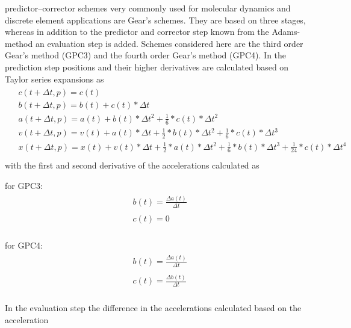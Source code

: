 \par
predictor–corrector schemes very commonly used for molecular dynamics and discrete element
applications are Gear’s schemes. They are based on three stages, whereas in addition to the
predictor and corrector step known from the Adams-method an evaluation step is added. Schemes
considered here are the third order Gear’s method (GPC3) and the fourth order Gear’s method (GPC4).
In the prediction step positions and their higher derivatives are calculated based on Taylor series
expansions as
\begin{align}\label{eqn:gearP}
    \begin{split}
        &c(t+\Delta{t}, p) = c(t)\\
        &b(t+\Delta{t}, p) = b(t) + c(t) *\Delta{t}\\
        &a(t+\Delta{t}, p) = a(t) + b(t) *\Delta{t}^2 + \frac{1}{6} * c(t) *\Delta{t}^2\\
        &v(t+\Delta{t}, p) = v(t) + a(t) *\Delta{t} + \frac{1}{2} * b(t) *\Delta{t}^2 + 
        \frac{1}{6} * c(t) *\Delta{t}^3\\
        &x(t+\Delta{t}, p) = x(t) + v(t) * \Delta{t} + \frac{1}{2} * a(t) *\Delta{t}^2 + 
        \frac{1}{6} * b(t) *\Delta{t}^3 + \frac{1}{24} * c(t) *\Delta{t}^4\\
    \end{split}
\end{align}
with the first and second derivative of the accelerations calculated as\par
for GPC3:
\begin{align}\label{eqn:gearJerk3}
    \begin{split}
        &b(t) = \frac{\Delta{a(t)}}{\Delta{t}}\\
        \\
        &c(t) = 0\\
    \end{split}
\end{align}\par
for GPC4:
\begin{align}\label{eqn:gearJerk4}
    \begin{split}
        &b(t) = \frac{\Delta{a(t)}}{\Delta{t}}\\
        \\
        &c(t) = \frac{\Delta{b(t)}}{\Delta{t}}\\
    \end{split}
\end{align}
\par
In the evaluation step the difference in the accelerations calculated based on the acceleration
